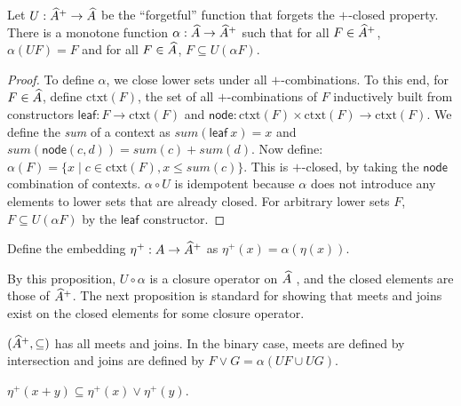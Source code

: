 \begin{proposition}
  Let $U : \widehat{A}^+ \to \widehat{A}$ be the ``forgetful''
  function that forgets the $+$-closed property. There is a monotone
  function $\alpha : \widehat{A} \to \widehat{A}^+$ such that
  for all $F \in \widehat{A}^+$, $\alpha(U F) = F$ and for all
  $F \in \widehat{A}$, $F \subseteq U (\alpha F)$.
\end{proposition}

\begin{proof}
  To define $\alpha$, we close lower sets under all
  $+$-combinations. To this end, for $F \in \widehat{A}$, define
  $\mathrm{ctxt}(F)$, the set of all $+$-combinations of $F$
  inductively built from constructors
  $\mathsf{leaf} : F \to \mathrm{ctxt}(F)$ and
  $\mathsf{node} : \mathrm{ctxt}(F) \times \mathrm{ctxt}(F) \to
  \mathrm{ctxt}(F)$. We define the \emph{sum} of a context as
  $\mathit{sum}(\mathsf{leaf}~x) = x$ and
  $\mathit{sum}(\mathsf{node}(c,d)) = \mathit{sum}(c) +
  \mathit{sum}(d)$. Now define:
  $\alpha(F) = \{ x \mid c \in \mathrm{ctxt}(F), x \leq
  \mathit{sum}(c) \}$. This is $+$-closed, by taking the
  $\mathsf{node}$ combination of contexts. $\alpha \circ U$ is
  idempotent because $\alpha$ does not introduce any elements to lower
  sets that are already closed. For arbitrary lower sets $F$,
  $F \subseteq U(\alpha F)$ by the $\mathsf{leaf}$ constructor.
\end{proof}

\begin{definition}
  Define the embedding $\eta^+ : A \to \widehat{A}^+$ as
  $\eta^+(x) = \alpha(\eta(x))$.
\end{definition}

\begin{remark}
  By this proposition, $U \circ \alpha$ is a closure operator on
  $\widehat{A}$ \cite{davey-priestley}, and the closed elements are
  those of $\widehat{A}^+$. The next proposition is standard for
  showing that meets and joins exist on the closed elements for some
  closure operator.
\end{remark}

\begin{proposition}
  $(\widehat{A}^+, \subseteq)$ has all meets and joins. In the
  binary case, meets are defined by intersection and joins are defined
  by $F \lor G = \alpha (U F \cup U G)$.
\end{proposition}

\begin{proposition}\label{prop:closed-eta-preserve-joins}
  $\eta^+(x + y) \subseteq \eta^+(x) \lor \eta^+(y)$.
\end{proposition}

